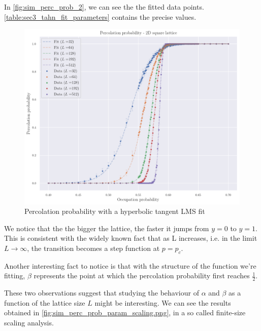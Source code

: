 In \autoref{fig:sim_perc_prob_2}, we can see the the fitted data points. \autoref{table:sec3_tahn_fit_parameters} contains the precise values.


\begin{figure}[H]
  \includegraphics[width=\linewidth]{Images/sim_perc_prob_2.png}
  \caption{Percolation probability with a hyperbolic tangent LMS fit}
  \label{fig:sim_perc_prob_2}
\end{figure}

We notice that the the bigger the lattice, the faster it jumps from $y=0$ to $y=1$. This is consistent with the widely known fact that as L increases, i.e. in the limit $L \rightarrow \infty $, the transition becomes a step function at $p = p_c$. 

Another interesting fact to notice is that with the structure of the function we're fitting, $\beta$ represents the point at which the percolation probability first reaches $\frac{1}{2}$.

These two observations suggest that studying the behaviour of $\alpha$ and $\beta$ as a function of the lattice size $L$ might be interesting. We can see the results obtained in \autoref{fig:sim_perc_prob_param_scaling.png}, in a so called finite-size scaling analysis.

